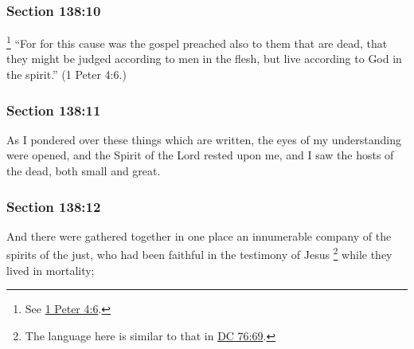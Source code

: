 	\subsubsection{Section 138:10} %
		\label{DC138-10}

			\footnote{%
				See \hyperref[1PETER-4-6]{1 Peter 4:6}.
				}%
		``For for this cause was the gospel preached also to them that are dead, that they might be judged according to men in the flesh, but live according to God in the spirit.'' (1 Peter 4:6.)


	\subsubsection{Section 138:11} %
		\label{DC138-11}

		As I pondered over these things which are written, the eyes of my understanding were opened, and the Spirit of the Lord rested upon me, and I saw the hosts of the dead, both small and great.


	\subsubsection{Section 138:12} %
		\label{DC138-12}

		And there were gathered together in one place an innumerable company of the spirits of the just, who had been faithful in the testimony of Jesus%
			\footnote{%
				The language here is similar to that in \hyperref[DC76-69]{DC 76:69}.
				}
		while they lived in mortality;


